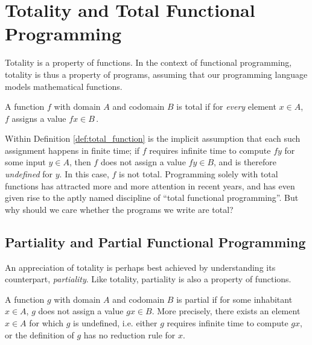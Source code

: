 


\section{Totality and Total Functional Programming}
\label{sec:totality}
Totality is a property of functions. In the context of functional programming,
totality is thus a property of programs, assuming that our programming language
models mathematical functions. 

\begin{definition}
\label{def:total_function}
A function $f$ with domain $A$ and codomain $B$ is total if for \emph{every}
element $x\in A$, $f$ assigns a value
$f x\in B$\,\citep{Turner04totalfunctional}.
\end{definition}

Within Definition \ref{def:total_function} is the implicit assumption that each
such assignment happens in finite time; if $f$ requires infinite time to compute
$f y$ for some input $y\in A$, then $f$ does not assign a value $f y\in B$, and is
therefore \emph{undefined} for $y$. In this case, $f$ is not total. Programming
solely with total functions has attracted more and more attention in recent
years, and has even given rise to the aptly named discipline of ``total
functional programming''. But why should we care whether the programs we write
are total?

\subsection{Partiality and Partial Functional Programming}
An appreciation of totality is perhaps best achieved by understanding its
counterpart, \emph{partiality}. Like totality, partiality is also a property of
functions. 

\begin{definition}
  A function $g$ with domain $A$ and codomain $B$ is partial if for some
  inhabitant $x\in A$, $g$ does not assign a value $g x\in B$. More precisely, there exists
  an element $x\in A$ for which $g$ is undefined, i.e. either $g$
  requires infinite time to compute $g x$, or the definition of $g$ has no
  reduction rule for $x$.
\end{definition}

